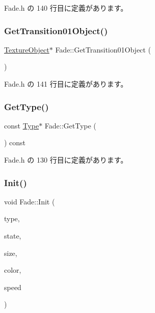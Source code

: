  Fade.\+h の 140 行目に定義があります。

\mbox{\label{class_fade_a4e047c532d430095e7d0d70288289a82}} 
\subsubsection{\texorpdfstring{Get\+Transition01\+Object()}{GetTransition01Object()}}
{\footnotesize\ttfamily \mbox{\hyperlink{class_texture_object}{Texture\+Object}}$\ast$ Fade\+::\+Get\+Transition01\+Object (\begin{DoxyParamCaption}{ }\end{DoxyParamCaption})\hspace{0.3cm}{\ttfamily [inline]}}



 Fade.\+h の 141 行目に定義があります。

\mbox{\label{class_fade_aed5a29d39a5fd6161a9aed73d5f30870}} 
\subsubsection{\texorpdfstring{Get\+Type()}{GetType()}}
{\footnotesize\ttfamily const \mbox{\hyperlink{class_fade_ac06f27215b454aa05b93c236476d6e80}{Type}}$\ast$ Fade\+::\+Get\+Type (\begin{DoxyParamCaption}{ }\end{DoxyParamCaption}) const\hspace{0.3cm}{\ttfamily [inline]}}



 Fade.\+h の 130 行目に定義があります。

\mbox{\label{class_fade_aab12848f7102a219968c86ed699a6e5d}} 
\subsubsection{\texorpdfstring{Init()}{Init()}}
{\footnotesize\ttfamily void Fade\+::\+Init (\begin{DoxyParamCaption}\item[{\mbox{\hyperlink{class_fade_ac06f27215b454aa05b93c236476d6e80}{Type}}}]{type,  }\item[{\mbox{\hyperlink{class_fade_ae77826bf3ff2ab95fb7b3b6f95cba80a}{State}}}]{state,  }\item[{\mbox{\hyperlink{_vector3_d_8h_a5ef6e95dfc5f9d3820b71772d99bbc25}{Vec2}}}]{size,  }\item[{\mbox{\hyperlink{_vector3_d_8h_a680c30c4a07d86fe763c7e01169cd6cc}{X\+Color4}}}]{color,  }\item[{float}]{speed }\end{DoxyParamCaption})}




